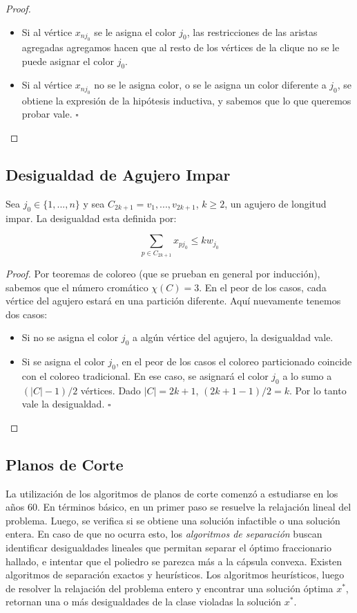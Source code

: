 \begin{proof}
\begin{itemize}
\item Si al vértice $x_{nj_0}$ se le asigna el color $j_0$, las restricciones de las aristas agregadas agregamos hacen que al resto de los vértices de la clique no se le puede asignar el color $j_0$.
\item Si al vértice $x_{nj_0}$ no se le asigna color, o se le asigna un color diferente a $j_0$, se obtiene la expresión de la hipótesis inductiva, y sabemos que lo que queremos probar vale. \hfill $\square$
\end{itemize}
\end{proof}

\subsection{Desigualdad de Agujero Impar}

Sea $j_0 \in \{1,...,n\}$ y sea $C_{2k+1} = v_1,...,v_{2k+1}$, $k \geq 2$, un agujero de longitud impar. La desigualdad esta definida por:

\begin{equation}
\sum_{p \in C_{2k+1}} x_{pj_0} \leq k w_{j_0}
\end{equation}

\begin{proof}
Por teoremas de coloreo (que se prueban en general por inducción), sabemos que el número cromático $\chi(C) = 3$. En el peor de los casos, cada vértice del agujero estará en una partición diferente. Aquí nuevamente tenemos dos casos:

\begin{itemize}
\item Si no se asigna el color $j_0$ a algún vértice del agujero, la desigualdad vale.
\item Si se asigna el color $j_0$, en el peor de los casos el coloreo particionado coincide con el coloreo tradicional. En ese caso, se asignará el color $j_0$ a lo sumo a $(|C|-1)/2$ vértices. Dado $|C| = 2k+1$,  $(2k+1-1)/2 = k$. Por lo tanto vale la desigualdad.  \hfill $\square$
\end{itemize}

\end{proof}

\subsection{Planos de Corte}

La utilización de los algoritmos de planos de corte comenzó a estudiarse en los años 60. En términos básico, en un primer paso se resuelve la relajación lineal del problema. Luego, se verifica si se obtiene una solución infactible o una solución entera. En caso de que no ocurra esto, los \textit{algoritmos de separación} buscan identificar desigualdades lineales que permitan separar el óptimo fraccionario hallado, e intentar que el poliedro se parezca más a la cápsula convexa. Existen algoritmos de separación exactos y heurísticos. Los algoritmos heurísticos, luego de resolver la relajación del problema entero y encontrar una solución óptima $x^*$, retornan una o más desigualdades de la clase violadas la solución $x^*$.

